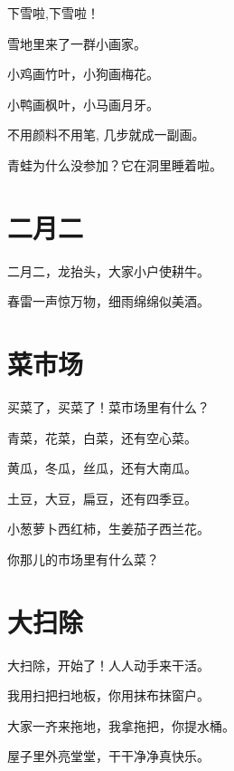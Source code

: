 \documentclass[12pt,UTF-8,openany]{ctexbook}
\begin{document}
\begin{large}
    
    下雪啦,下雪啦！
    
    雪地里来了一群小画家。
    
    小鸡画竹叶，小狗画梅花。
    
    小鸭画枫叶，小马画月牙。
    
    不用颜料不用笔, 几步就成一副画。
    
    青蛙为什么没参加？它在洞里睡着啦。
    
\end{large}





\chapter{二月二}

\begin{large}
    
    二月二，龙抬头，大家小户使耕牛。
    
    春雷一声惊万物，细雨绵绵似美酒。
    
\end{large}





\chapter{菜市场}

\begin{large}
    
    买菜了，买菜了！菜市场里有什么？
    
    青菜，花菜，白菜，还有空心菜。
    
    黄瓜，冬瓜，丝瓜，还有大南瓜。
    
    土豆，大豆，扁豆，还有四季豆。
    
    小葱萝卜西红柿，生姜茄子西兰花。
    
    你那儿的市场里有什么菜？
    
\end{large}





\chapter{大扫除}

\begin{large}
    
    大扫除，开始了！人人动手来干活。
    
    我用扫把扫地板，你用抹布抹窗户。
    
    大家一齐来拖地，我拿拖把，你提水桶。
    
    屋子里外亮堂堂，干干净净真快乐。
    
\end{large}
\end{document}
